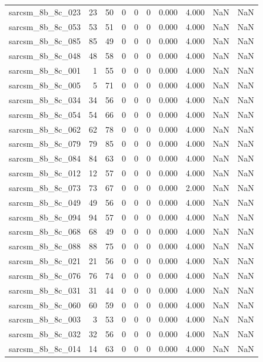 \documentclass{article}
\begin{document}
\begin{longtable}{lrrrrrrrrr}
sarcsm\_8b\_8c\_023 & 23 & 50 & 0 & 0 & 0 & 0.000 & 4.000 & NaN & NaN \\
sarcsm\_8b\_8c\_053 & 53 & 51 & 0 & 0 & 0 & 0.000 & 4.000 & NaN & NaN \\
sarcsm\_8b\_8c\_085 & 85 & 49 & 0 & 0 & 0 & 0.000 & 4.000 & NaN & NaN \\
sarcsm\_8b\_8c\_048 & 48 & 58 & 0 & 0 & 0 & 0.000 & 4.000 & NaN & NaN \\
sarcsm\_8b\_8c\_001 & 1 & 55 & 0 & 0 & 0 & 0.000 & 4.000 & NaN & NaN \\
sarcsm\_8b\_8c\_005 & 5 & 71 & 0 & 0 & 0 & 0.000 & 4.000 & NaN & NaN \\
sarcsm\_8b\_8c\_034 & 34 & 56 & 0 & 0 & 0 & 0.000 & 4.000 & NaN & NaN \\
sarcsm\_8b\_8c\_054 & 54 & 66 & 0 & 0 & 0 & 0.000 & 4.000 & NaN & NaN \\
sarcsm\_8b\_8c\_062 & 62 & 78 & 0 & 0 & 0 & 0.000 & 4.000 & NaN & NaN \\
sarcsm\_8b\_8c\_079 & 79 & 85 & 0 & 0 & 0 & 0.000 & 4.000 & NaN & NaN \\
sarcsm\_8b\_8c\_084 & 84 & 63 & 0 & 0 & 0 & 0.000 & 4.000 & NaN & NaN \\
sarcsm\_8b\_8c\_012 & 12 & 57 & 0 & 0 & 0 & 0.000 & 4.000 & NaN & NaN \\
sarcsm\_8b\_8c\_073 & 73 & 67 & 0 & 0 & 0 & 0.000 & 2.000 & NaN & NaN \\
sarcsm\_8b\_8c\_049 & 49 & 56 & 0 & 0 & 0 & 0.000 & 4.000 & NaN & NaN \\
sarcsm\_8b\_8c\_094 & 94 & 57 & 0 & 0 & 0 & 0.000 & 4.000 & NaN & NaN \\
sarcsm\_8b\_8c\_068 & 68 & 49 & 0 & 0 & 0 & 0.000 & 4.000 & NaN & NaN \\
sarcsm\_8b\_8c\_088 & 88 & 75 & 0 & 0 & 0 & 0.000 & 4.000 & NaN & NaN \\
sarcsm\_8b\_8c\_021 & 21 & 56 & 0 & 0 & 0 & 0.000 & 4.000 & NaN & NaN \\
sarcsm\_8b\_8c\_076 & 76 & 74 & 0 & 0 & 0 & 0.000 & 4.000 & NaN & NaN \\
sarcsm\_8b\_8c\_031 & 31 & 44 & 0 & 0 & 0 & 0.000 & 4.000 & NaN & NaN \\
sarcsm\_8b\_8c\_060 & 60 & 59 & 0 & 0 & 0 & 0.000 & 4.000 & NaN & NaN \\
sarcsm\_8b\_8c\_003 & 3 & 53 & 0 & 0 & 0 & 0.000 & 4.000 & NaN & NaN \\
sarcsm\_8b\_8c\_032 & 32 & 56 & 0 & 0 & 0 & 0.000 & 4.000 & NaN & NaN \\
sarcsm\_8b\_8c\_014 & 14 & 63 & 0 & 0 & 0 & 0.000 & 4.000 & NaN & NaN \\

\end{longtable}
\end{document}
